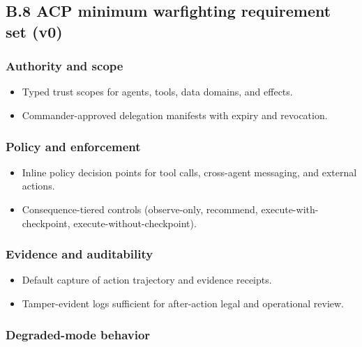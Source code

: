 \documentclass[
]{article}
\providecommand{\tightlist}{%
  \setlength{\itemsep}{0pt}\setlength{\parskip}{0pt}}
\begin{document}
\hypertarget{b.8-acp-minimum-warfighting-requirement-set-v0}{%
\subsection{B.8 ACP minimum warfighting requirement set
(v0)}\label{b.8-acp-minimum-warfighting-requirement-set-v0}}

\hypertarget{authority-and-scope}{%
\subsubsection{Authority and scope}\label{authority-and-scope}}

\begin{itemize}
\tightlist
\item
  Typed trust scopes for agents, tools, data domains, and effects.
\item
  Commander-approved delegation manifests with expiry and revocation.
\end{itemize}

\hypertarget{policy-and-enforcement}{%
\subsubsection{Policy and enforcement}\label{policy-and-enforcement}}

\begin{itemize}
\tightlist
\item
  Inline policy decision points for tool calls, cross-agent messaging,
  and external actions.
\item
  Consequence-tiered controls (observe-only, recommend,
  execute-with-checkpoint, execute-without-checkpoint).
\end{itemize}

\hypertarget{evidence-and-auditability}{%
\subsubsection{Evidence and
auditability}\label{evidence-and-auditability}}

\begin{itemize}
\tightlist
\item
  Default capture of action trajectory and evidence receipts.
\item
  Tamper-evident logs sufficient for after-action legal and operational
  review.
\end{itemize}

\hypertarget{degraded-mode-behavior}{%
\subsubsection{Degraded-mode behavior}\label{degraded-mode-behavior}}
\end{document}
